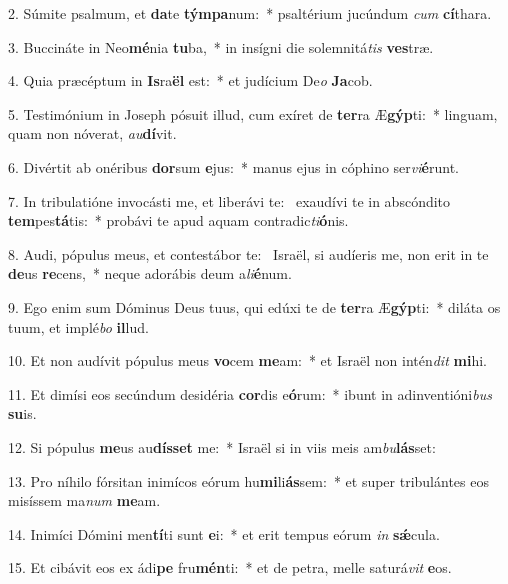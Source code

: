 2. Súmite psalmum, et \textbf{da}te \textbf{tým}\textbf{pa}num:~*  psaltérium jucúndum \textit{cum} \textbf{cí}thara.\

3. Buccináte in Neo\textbf{mé}nia \textbf{tu}ba,~*  in insígni die solemnitá\textit{tis} \textbf{ves}træ.\

4. Quia præcéptum in \textbf{Is}ra\textbf{ël} est:~*  et judícium De\textit{o} \textbf{Ja}cob.\

5. Testimónium in Joseph pósuit illud, cum exíret de \textbf{ter}ra Æ\textbf{gýp}ti:~*  linguam, quam non nóverat, \textit{au}\textbf{dí}vit.\

6. Divértit ab onéribus \textbf{dor}sum \textbf{e}jus:~*  manus ejus in cóphino ser\textit{vi}\textbf{é}runt.\

7. In tribulatióne invocásti me, et liberávi te: \dag\  exaudívi te in abscóndito \textbf{tem}pes\textbf{tá}tis:~*  probávi te apud aquam contradic\textit{ti}\textbf{ó}nis.\

8. Audi, pópulus meus, et contestábor te: \dag\  Israël, si audíeris me, non erit in te \textbf{de}us \textbf{re}cens,~*  neque adorábis deum a\textit{li}\textbf{é}num.\

9. Ego enim sum Dóminus Deus tuus, qui edúxi te de \textbf{ter}ra Æ\textbf{gýp}ti:~*  diláta os tuum, et implé\textit{bo} \textbf{il}lud.\

10. Et non audívit pópulus meus \textbf{vo}cem \textbf{me}am:~*  et Israël non intén\textit{dit} \textbf{mi}hi.\

11. Et dimísi eos secúndum desidéria \textbf{cor}dis e\textbf{ó}rum:~*  ibunt in adinventióni\textit{bus} \textbf{su}is.\

12. Si pópulus \textbf{me}us au\textbf{dís}\textbf{set} me:~*  Israël si in viis meis am\textit{bu}\textbf{lás}set:\

13. Pro níhilo fórsitan inimícos eórum hu\textbf{mi}li\textbf{ás}sem:~*  et super tribulántes eos misíssem ma\textit{num} \textbf{me}am.\

14. Inimíci Dómini men\textbf{tí}ti sunt \textbf{e}i:~*  et erit tempus eórum \textit{in} \textbf{sǽ}cula.\

15. Et cibávit eos ex ádi\textbf{pe} fru\textbf{mén}ti:~*  et de petra, melle saturá\textit{vit} \textbf{e}os.\

